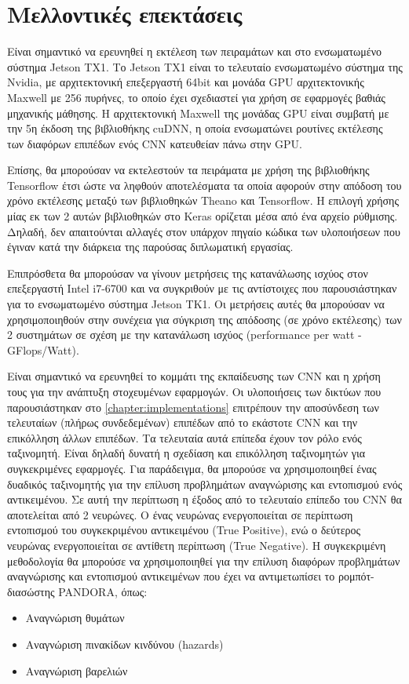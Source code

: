 \chapter{Μελλοντικές επεκτάσεις}
\label{chapter:future_work}

Είναι σημαντικό να ερευνηθεί η εκτέλεση των πειραμάτων και στο ενσωματωμένο σύστημα
Jetson TΧ1. Το Jetson TX1 είναι το τελευταίο ενσωματωμένο σύστημα της Nvidia,
με αρχιτεκτονική επεξεργαστή 64bit και μονάδα GPU αρχιτεκτονικής Maxwell με
256 πυρήνες, το οποίο έχει σχεδιαστεί για χρήση σε εφαρμογές βαθιάς
μηχανικής μάθησης. Η αρχιτεκτονική Maxwell της μονάδας GPU είναι συμβατή
με την 5η έκδοση της βιβλιοθήκης cuDNN, η οποία ενσωματώνει ρουτίνες
εκτέλεσης των διαφόρων επιπέδων ενός CNN κατευθείαν πάνω στην GPU.

Επίσης, θα μπορούσαν να εκτελεστούν τα πειράματα με χρήση της βιβλιοθήκης
Tensorflow έτσι ώστε να ληφθούν αποτελέσματα τα οποία αφορούν στην απόδοση
του χρόνο εκτέλεσης μεταξύ των βιβλιοθηκών Theano και Tensorflow.
Η επιλογή χρήσης μίας εκ των 2 αυτών βιβλιοθηκών στο Keras ορίζεται μέσα από
ένα αρχείο ρύθμισης. Δηλαδή, δεν απαιτούνται αλλαγές στον υπάρχον πηγαίο κώδικα
των υλοποιήσεων που έγιναν κατά την διάρκεια της παρούσας διπλωματική εργασίας.

Επιπρόσθετα θα μπορούσαν να γίνουν μετρήσεις της κατανάλωσης ισχύος στον
επεξεργαστή Intel i7-6700 και να συγκριθούν με τις αντίστοιχες
που παρουσιάστηκαν για το ενσωματωμένο σύστημα Jetson TK1. Οι
μετρήσεις αυτές θα μπορούσαν να χρησιμοποιηθούν στην συνέχεια για σύγκριση
της απόδοσης (σε χρόνο εκτέλεσης) των 2 συστημάτων σε σχέση με την κατανάλωση
ισχύος (performance per watt - GFlops/Watt).

Είναι σημαντικό να ερευνηθεί το κομμάτι της εκπαίδευσης των CNN
και η χρήση τους για την ανάπτυξη στοχευμένων εφαρμογών.
Οι υλοποιήσεις των δικτύων που παρουσιάστηκαν στο \autoref{chapter:implementations}
επιτρέπουν την αποσύνδεση των τελευταίων (πλήρως συνδεδεμένων) επιπέδων από
το εκάστοτε CNN και την επικόλληση άλλων επιπέδων.
Τα τελευταία αυτά επίπεδα έχουν τον ρόλο ενός ταξινομητή. Είναι δηλαδή
δυνατή η σχεδίαση και επικόλληση ταξινομητών για συγκεκριμένες εφαρμογές.
Για παράδειγμα, θα μπορούσε να χρησιμοποιηθεί ένας δυαδικός ταξινομητής
για την επίλυση προβλημάτων αναγνώρισης και εντοπισμού ενός αντικειμένου. Σε αυτή
την περίπτωση η έξοδος από το τελευταίο επίπεδο του CNN θα αποτελείται
από 2 νευρώνες. Ο ένας νευρώνας ενεργοποιείται σε περίπτωση εντοπισμού
του συγκεκριμένου αντικειμένου (True Positive), ενώ ο δεύτερος νευρώνας ενεργοποιείται
σε αντίθετη περίπτωση (True Negative).
Η συγκεκριμένη μεθοδολογία θα μπορούσε να χρησιμοποιηθεί για την επίλυση διαφόρων
προβλημάτων αναγνώρισης και εντοπισμού αντικειμένων που έχει να αντιμετωπίσει το ρομπότ-διασώστης PANDORA,
όπως:
\begin{itemize}
  \item{Αναγνώριση θυμάτων}
  \item{Αναγνώριση πινακίδων κινδύνου (hazards)}
  \item{Αναγνώριση βαρελιών}
\end{itemize}


